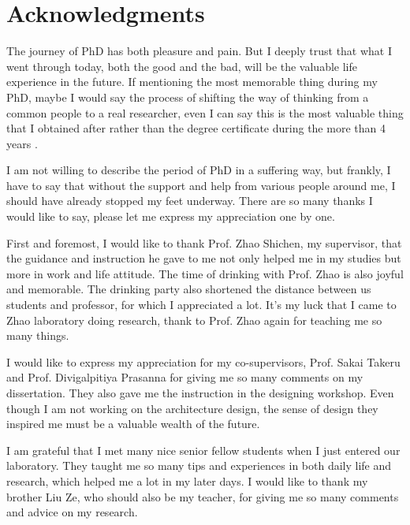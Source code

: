 \documentclass[12pt, twoside, a4paper]{book} %
\renewcommand{\baselinestretch}{1.5} %
\begin{document}
\frontmatter

\renewcommand{\baselinestretch}{1.5} %
\fontsize{13pt}{13pt} %
\selectfont

\chapter{Acknowledgments}
The journey of PhD has both pleasure and pain. But I deeply trust that what I went through today, both the good and the bad, will be the valuable life experience in the future. If mentioning the most memorable thing during my PhD, maybe I would say the process of shifting the way of thinking from a common people to a real researcher, even I can say this is the most valuable thing that I obtained after rather than the degree certificate during the more than 4 years .

I am not willing to describe the period of PhD in a suffering way, but frankly, I have to say that without the support and help from various people around me, I should have already stopped my feet underway. There are so many thanks I would like to say, please let me express my appreciation one by one.

First and foremost, I would like to thank Prof. Zhao Shichen, my supervisor, that the guidance and instruction he gave to me not only helped me in my studies but more in work and life attitude. The time of drinking with Prof. Zhao is also joyful and memorable. The drinking party also shortened the distance between us students and professor, for which I appreciated a lot. It's my luck that I came to Zhao laboratory doing research, thank to Prof. Zhao again for teaching me so many things.

I would like to express my appreciation for my co-supervisors, Prof. Sakai Takeru and Prof. Divigalpitiya Prasanna for giving me so many comments on my dissertation. They also gave me the instruction in the designing workshop. Even though I am not working on the architecture design, the sense of design they inspired me must be a valuable wealth of the future.

I am grateful that I met many nice senior fellow students when I just entered our laboratory. They taught me so many tips and experiences in both daily life and research, which helped me a lot in my later days. I would like to thank my brother Liu Ze, who should also be my teacher, for giving me so many comments and advice on my research. 
\end{document}

